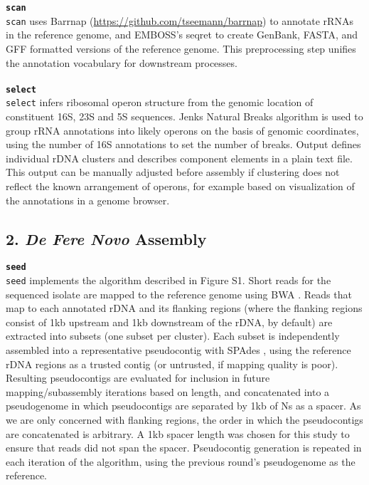 \textbf{\texttt{scan}}\\
\texttt{scan} uses Barrnap (\url{https://github.com/tseemann/barrnap}) to annotate rRNAs in the reference genome, and EMBOSS's seqret \cite{Rice2000a} to create GenBank, FASTA, and GFF formatted versions of the reference genome. This preprocessing step unifies the annotation vocabulary for downstream processes.\\
\\
\textbf{\texttt{select}}\\
\texttt{select} infers ribosomal operon structure from the genomic location of constituent 16S, 23S and 5S sequences. Jenks Natural Breaks algorithm is used to group rRNA annotations into likely operons on the basis of genomic coordinates, using the number of 16S annotations to set the number of breaks. Output defines individual rDNA clusters and describes component elements in a plain text file. This output can be manually adjusted before assembly if clustering does not reflect the known arrangement of operons, for example based on visualization of the annotations in a genome browser.

\subsection*{2. \textit{De Fere Novo} Assembly}

\textbf{\texttt{seed}}\\
\texttt{seed} implements the algorithm described in Figure S1. Short reads for the sequenced isolate are mapped to the reference genome using BWA \cite{Li2009}. Reads that map to each annotated rDNA and its flanking regions (where the flanking regions consist of 1kb upstream and 1kb downstream of the rDNA, by default) are extracted into subsets (one subset per cluster). Each subset is independently assembled into a representative pseudocontig with SPAdes \cite{Bankevich2012}, using the reference rDNA regions as a trusted contig (or untrusted, if mapping quality is poor). Resulting pseudocontigs are evaluated for inclusion in future mapping/subassembly iterations based on length, and concatenated into a pseudogenome in which pseudocontigs are separated by 1kb of Ns as a spacer. As we are only concerned with flanking regions, the order in which the pseudocontigs are concatenated is arbitrary. A 1kb spacer length was chosen for this study to ensure that reads did not span the spacer. Pseudocontig generation is repeated in each iteration of the algorithm, using the previous round's pseudogenome as the reference.


